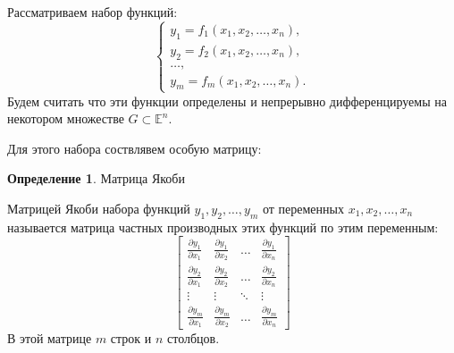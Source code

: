 \documentclass{article}
\theoremstyle{plain}
\theoremstyle{definition}
\newtheorem{definition}{Определение}
\theoremstyle{remark}
\begin{document}
Рассматриваем набор функций:
\begin{equation}
    \begin{cases}
        y_1 = f_1(x_1, x_2, \ldots, x_n), \\
        y_2 = f_2(x_1, x_2, \ldots, x_n), \\
        \ldots, \\
        y_m = f_m(x_1, x_2, \ldots, x_n).
    \end{cases}
\end{equation}
Будем считать что эти функции определены и непрерывно дифференцируемы
на некотором множестве $G \subset \mathbb{E}^n$.

Для этого набора соствлявем особую матрицу:
\begin{definition}{Матрица Якоби}

Матрицей Якоби набора функций $y_1, y_2, \ldots, y_m$ от переменных
$x_1, x_2, \ldots, x_n$ называется матрица частных производных этих функций
по этим переменным:
\begin{equation}
    \begin{bmatrix}
        \frac{\partial y_1}{\partial x_1} & \frac{\partial y_1}{\partial x_2} & \ldots & \frac{\partial y_1}{\partial x_n} \\
        \frac{\partial y_2}{\partial x_1} & \frac{\partial y_2}{\partial x_2} & \ldots & \frac{\partial y_2}{\partial x_n} \\
        \vdots & \vdots & \ddots & \vdots \\
        \frac{\partial y_m}{\partial x_1} & \frac{\partial y_m}{\partial x_2} & \ldots & \frac{\partial y_m}{\partial x_n}
    \end{bmatrix}
\end{equation}
В этой матрице $m$ строк и $n$ столбцов.
\end{definition}
\end{document}
